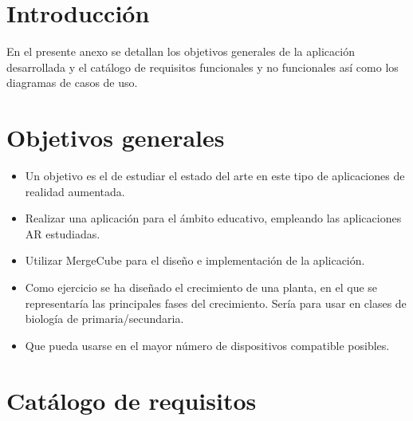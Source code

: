 
\section{Introducción}
En el presente anexo se detallan los objetivos generales de la aplicación desarrollada y el catálogo de requisitos funcionales y no funcionales así como los diagramas de casos de uso.
\section{Objetivos generales}
\begin{itemize}
	\item Un objetivo es el de estudiar el estado del arte en este tipo de aplicaciones de realidad aumentada. 
	\item Realizar una aplicación para el ámbito educativo, empleando las aplicaciones AR estudiadas.
	\item Utilizar MergeCube para el diseño e implementación de la aplicación.
	\item Como ejercicio se ha diseñado el crecimiento de una planta, en el que se representaría las principales fases del crecimiento. Sería para usar en clases de biología de primaria/secundaria.
	\item Que pueda usarse en el mayor número de dispositivos compatible posibles.
\end{itemize}
\section{Catálogo de requisitos}

